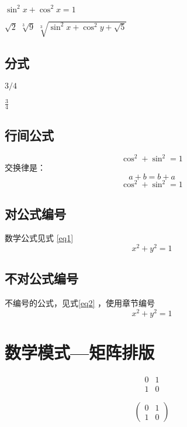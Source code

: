 \documentclass[]{ctexart}
\begin{document}
 	$ \sin^2x + \cos^2x = 1 $
 	
 	$ \sqrt{2} $
 	$ \sqrt[3]{9} $
 	$ \sqrt[3]{ \sin^2x + \cos^2y + \sqrt{5} } $
 	
 	\subsection{分式}
 	$ 3/4 $
 	
 	$ \frac{3}{4} $
 	
 	\subsection{行间公式}
 	$$ \cos^2 + \sin^2 = 1 $$ 
 	交换律是： \[ a+b = b+a \]
 	\begin{displaymath}
 		\cos^2 + \sin^2 = 1
 	\end{displaymath}
 	
 	\subsection{对公式编号}
 	数学公式见式 \ref{eq1}	%
 	\begin{equation}
 		x^2 + y^2 =1 
 		\label{eq1}
 	\end{equation}
 	
 	\subsection{不对公式编号}
 	不编号的公式，见式\ref{eq2} ，使用章节编号
 	\begin{equation*}
 		x^2 + y^2 =1 
 		\label{eq2}
 	\end{equation*}
 	
	\section{数学模式—矩阵排版}

	\[
		\begin{matrix}
		0 & 1 \\
		1 & 0
		\end{matrix}
	\]
	
	\[
		\begin{pmatrix}
			0 & 1 \\
			1 & 0
		\end{pmatrix}
	\]
	
\end{document}
